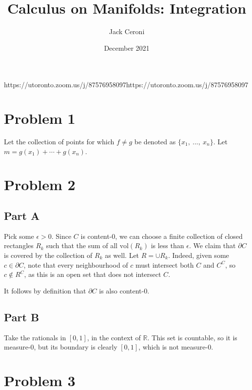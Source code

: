 \documentclass[10pt, oneside]{amsart}
\title{Calculus on Manifolds: Integration}
\author{Jack Ceroni}
\date{December 2021}
\begin{document}
    \maketitle

    \tableofcontents

    \vspace{.25in}

    \newpage

    \hrulefill

    https://utoronto.zoom.us/j/87576958097https://utoronto.zoom.us/j/87576958097   \section{Problem 1}

    Let the collection of points for which $f \neq g$ be denoted as $\{x_1, \ ..., \ x_n\}$. Let $m = g(x_1) + \cdots + g(x_n)$. 

    \hrulefill

    \section{Problem 2}

    \subsection{Part A} Pick some $\epsilon > 0$. Since $C$ is content-$0$, we can choose a finite collection of closed rectangles $R_k$ such that the sum of all $\text{vol}(R_k)$ is less than $\epsilon$.
    We claim that $\partial C$ is covered by the collection of $R_k$ as well. Let $R = \cup R_k$. Indeed, given some $c \in \partial C$, note that every neighbourhood of $c$ must intersect both $C$ and $C^{C}$,
    so $c \notin R^{C}$, as this is an open set that does not intersect $C$.
    \newline

    It follows by definition that $\partial C$ is also content-$0$.

    \subsection{Part B} Take the rationals in $[0, 1]$, in the context of $\mathbb{R}$. This set is countable, so it is measure-$0$, but its boundary is clearly $[0, 1]$, which is not measure-$0$.

    \hrulefill

    \section{Problem 3}
\end{document}
